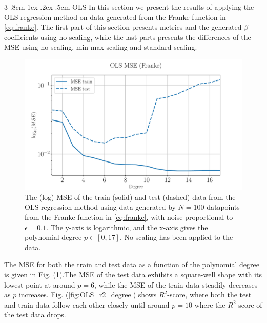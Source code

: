 \documentclass[%
reprint,
amsmath,amssymb,
aps,
pra,
]{revtex4-2}
\makeatletter
\renewcommand{\subsubsection}{%
	\@startsection
	{subsubsection}%
	{3}%
	{\z@}%
	{.8cm \@plus1ex \@minus .2ex}%
	{.5cm}%
	{\normalfont\small\centering}%
}
\makeatother
\begin{document}
\subsubsection{OLS}
In this section we present the results of applying the OLS regression method on data generated from the Franke function in \eqref{eq:franke}. The first part of this section presents metrics and the generated \(\beta\)-coefficients using no scaling, while the last parts presents the differences of the MSE using no scaling, min-max scaling and standard scaling.
\begin{figure}[H]
	\centering
	\includegraphics[width=\linewidth]{Python/Figures/OLS/OLS_MSE_no_scaling.pdf}
	\caption{The (log) MSE of the train (solid) and test (dashed) data from the OLS regression method using data generated by \(N=100\) datapoints from the Franke function in \eqref{eq:franke}, with noise proportional to \(\epsilon=0.1\). The y-axis is logarithmic, and the x-axis gives the polynomial degree \(p\in[0,17]\). No scaling has been applied to the data.}
	\label{fig:OLS_mse_degree}
\end{figure}
The MSE for both the train and test data as a function of the polynomial degree is given in Fig. (\ref{fig:OLS_mse_degree}).The MSE of the test data exhibits a square-well shape with its lowest point at around \(p=6\), while the MSE of the train data steadily decreases as \(p\) increases. Fig. (\ref{fig:OLS_r2_degree}) shows \(R^2\)-score, where both the test and train data follow each other closely until around \(p=10\) where the \(R^2\)-score of the test data drops.
\end{document}
